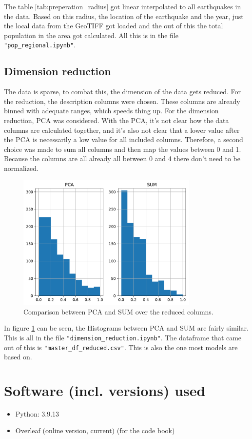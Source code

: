 \documentclass[a4paper]{article}
\newcommand\Plotwidth{0.8}
\begin{document}
The table \ref{tab:preperation_radius} got linear interpolated to all earthquakes in the data. Based on this radius, the location of the earthquake and the year, just the local data from the GeoTIFF got loaded and the out of this the total population in the area got calculated. All this is in the file \lstinline{"pop_regional.ipynb"}.

\subsection{Dimension reduction}

The data is sparse, to combat this, the dimension of the data gets reduced. For the reduction, the description columns were chosen. These columns are already binned with adequate ranges, which speeds thing up. For the dimension reduction, PCA was considered. With the PCA, it's not clear how the data columns are calculated together, and it's also not clear that a lower value after the PCA is necessarily a low value for all included columns. Therefore, a second choice was made to sum all columns and then map the values between 0 and 1. Because the columns are all already all between 0 and 4 there don't need to be normalized.

\begin{figure}[h]
    \centering
    \includegraphics[width=\Plotwidth\textwidth]{Plots/PCA_SUM.pdf}
    \caption{Comparison between PCA and SUM over the reduced columns.}
    \label{fig:PCA_SUM}
\end{figure}

In figure \ref{fig:PCA_SUM} can be seen, the Histograms between PCA and SUM are fairly similar. This is all in the file \lstinline{"dimension_reduction.ipynb"}. The dataframe that came out of this is \lstinline{"master_df_reduced.csv"}. This is also the one most models are based on.

\FloatBarrier
\section{Software (incl. versions) used}

\begin{itemize}
    \item Python: 3.9.13
    \item Overleaf (online version, current) (for the code book)
\end{itemize}
\end{document}
